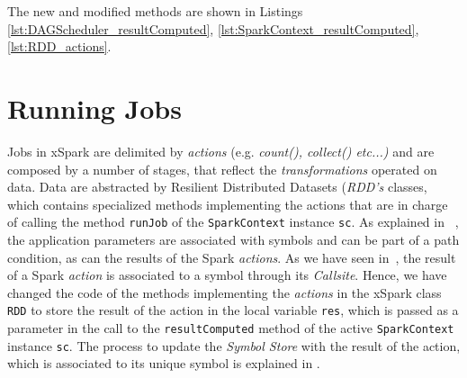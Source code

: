 The new and modified methods are shown in Listings \ref{lst:DAGScheduler_resultComputed}, \ref{lst:SparkContext_resultComputed}, \ref{lst:RDD_actions}.





\section{Running Jobs}\label{sec:running_jobs}
Jobs in xSpark are delimited by \textit{actions} (e.g. \textit{count(), collect()  etc...)} and are composed by a number of stages, that reflect the \textit{transformations} operated on data. Data are abstracted by Resilient Distributed Datasets (\textit{RDD's} classes, which contains specialized methods implementing the actions that are in charge of calling the method \texttt{runJob} of  the \texttt{SparkContext} instance \texttt{sc}. As explained in ~, the application parameters are associated with symbols and can be part of a path condition, as can the results of the Spark \textit{actions}. As we have seen in~, the result of a Spark \textit{action} is associated to a symbol through its \textit{Callsite}. Hence, we have changed the code of the methods implementing the \textit{actions} in the xSpark class \texttt{RDD} to store the result of the action in the local variable \texttt{res}, which is passed as a parameter in the call to the \texttt{resultComputed} method of the active \texttt{SparkContext} instance \texttt{sc}. The process to update the \tool \textit{Symbol Store} with the result of the action, which is associated to its unique symbol is explained in  .  

